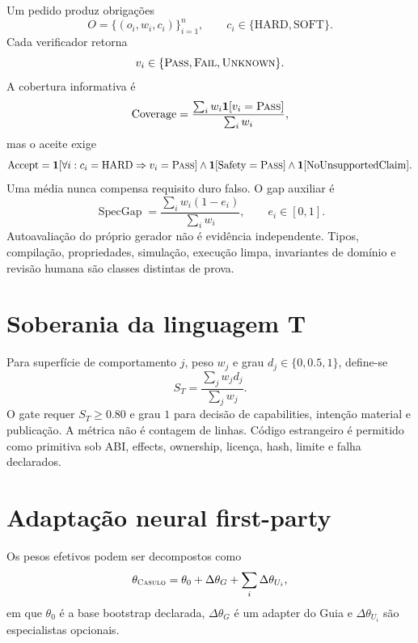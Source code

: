 \documentclass[10pt,a4paper]{article}
\newcommand{\Casulo}{\textsc{Casulo}}
\newcommand{\Pass}{\textsc{Pass}}
\newcommand{\Fail}{\textsc{Fail}}
\newcommand{\Unknown}{\textsc{Unknown}}
\begin{document}
Um pedido produz obrigações
\begin{equation}
O=\{(o_i,w_i,c_i)\}_{i=1}^{n},
\qquad c_i\in\{\mathrm{HARD},\mathrm{SOFT}\}.
\end{equation}
Cada verificador retorna
\begin{equation}
v_i\in\{\Pass,\Fail,\Unknown\}.
\end{equation}
A cobertura informativa é
\begin{equation}
\operatorname{Coverage}=
\frac{\sum_i w_i\mathbf 1[v_i=\Pass]}{\sum_i w_i},
\end{equation}
mas o aceite exige
\begin{equation}
\operatorname{Accept}=
\mathbf 1[\forall i:c_i=\mathrm{HARD}\Rightarrow v_i=\Pass]
\land\mathbf 1[\mathrm{Safety}=\Pass]
\land\mathbf 1[\mathrm{NoUnsupportedClaim}].
\end{equation}
Uma média nunca compensa requisito duro falso. O gap auxiliar é
\begin{equation}
\operatorname{SpecGap}=
\frac{\sum_i w_i(1-e_i)}{\sum_iw_i},\qquad e_i\in[0,1].
\end{equation}
Autoavaliação do próprio gerador não é evidência independente. Tipos,
compilação, propriedades, simulação, execução limpa, invariantes de domínio e
revisão humana são classes distintas de prova.

\section{Soberania da linguagem T}

Para superfície de comportamento $j$, peso $w_j$ e grau
$d_j\in\{0,0.5,1\}$, define-se
\begin{equation}
S_T=\frac{\sum_jw_jd_j}{\sum_jw_j}.
\end{equation}
O gate requer $S_T\ge0.80$ e grau $1$ para decisão de capabilities, intenção
material e publicação. A métrica não é contagem de linhas. Código estrangeiro
é permitido como primitiva sob ABI, effects, ownership, licença, hash, limite e
falha declarados.

\section{Adaptação neural first-party}

Os pesos efetivos podem ser decompostos como
\begin{equation}
\theta_{\Casulo}=\theta_0+\Delta\theta_G+\sum_i\Delta\theta_{U_i},
\end{equation}
em que $\theta_0$ é a base bootstrap declarada, $\Delta\theta_G$ é um adapter
do Guia e $\Delta\theta_{U_i}$ são especialistas opcionais.
\end{document}
